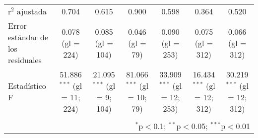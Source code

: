 \documentclass[spanish,11pt]{article}
\begin{document}
\begin{table}[!htbp]
\begin{tabular}{@{\extracolsep{5pt}}lcccccc}
r$^{2}$ ajustada & 0.704 & 0.615 & 0.900 & 0.598 & 0.364 & 0.520 \\ 
Error estándar de los residuales & 0.078 (gl = 224) & 0.085 (gl = 104) & 0.046 (gl = 79) & 0.090 (gl = 253) & 0.075 (gl = 312) & 0.066 (gl = 312) \\ 
Estadístico F & 51.886$^{***}$ (gl = 11; 224) & 21.095$^{***}$ (gl = 9; 104) & 81.066$^{***}$ (gl = 10; 79) & 33.909$^{***}$ (gl = 12; 253) & 16.434$^{***}$ (gl = 12; 312) & 30.219$^{***}$ (gl = 12; 312) \\ 
\hline 
\hline \\[-1.8ex] 
\multicolumn{7}{r}{$^{*}$p$<$0.1; $^{**}$p$<$0.05; $^{***}$p$<$0.01} \\ 
\end{tabular} 
\end{table} 
\end{document}
